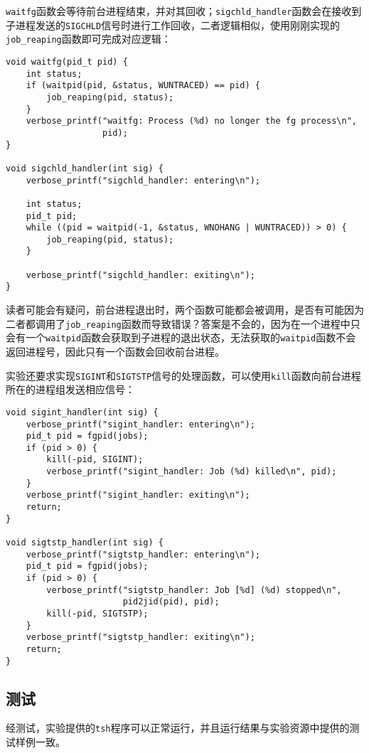 \documentclass[a4paper, 11pt]{ctexart}
\begin{document}
\texttt{waitfg}函数会等待前台进程结束，并对其回收；\texttt{sigchld\_handler}函数会在接收到子进程发送的\texttt{SIGCHLD}信号时进行工作回收，二者逻辑相似，使用刚刚实现的\texttt{job\_reaping}函数即可完成对应逻辑：

\begin{verbatim}
void waitfg(pid_t pid) {
    int status;
    if (waitpid(pid, &status, WUNTRACED) == pid) {
        job_reaping(pid, status);
    }
    verbose_printf("waitfg: Process (%d) no longer the fg process\n",
                   pid);
}

void sigchld_handler(int sig) {
    verbose_printf("sigchld_handler: entering\n");

    int status;
    pid_t pid;
    while ((pid = waitpid(-1, &status, WNOHANG | WUNTRACED)) > 0) {
        job_reaping(pid, status);
    }

    verbose_printf("sigchld_handler: exiting\n");
}
\end{verbatim}

读者可能会有疑问，前台进程退出时，两个函数可能都会被调用，是否有可能因为二者都调用了\texttt{job\_reaping}函数而导致错误？答案是不会的，因为在一个进程中只会有一个\texttt{waitpid}函数会获取到子进程的退出状态，无法获取的\texttt{waitpid}函数不会返回进程号，因此只有一个函数会回收前台进程。

实验还要求实现\texttt{SIGINT}和\texttt{SIGTSTP}信号的处理函数，可以使用\texttt{kill}函数向前台进程所在的进程组发送相应信号：

\begin{verbatim}
void sigint_handler(int sig) {
    verbose_printf("sigint_handler: entering\n");
    pid_t pid = fgpid(jobs);
    if (pid > 0) {
        kill(-pid, SIGINT);
        verbose_printf("sigint_handler: Job (%d) killed\n", pid);
    }
    verbose_printf("sigint_handler: exiting\n");
    return;
}

void sigtstp_handler(int sig) {
    verbose_printf("sigtstp_handler: entering\n");
    pid_t pid = fgpid(jobs);
    if (pid > 0) {
        verbose_printf("sigtstp_handler: Job [%d] (%d) stopped\n",
                       pid2jid(pid), pid);
        kill(-pid, SIGTSTP);
    }
    verbose_printf("sigtstp_handler: exiting\n");
    return;
}
\end{verbatim}

\subsection{测试}

经测试，实验提供的\texttt{tsh}程序可以正常运行，并且运行结果与实验资源中提供的测试样例一致。
\end{document}
